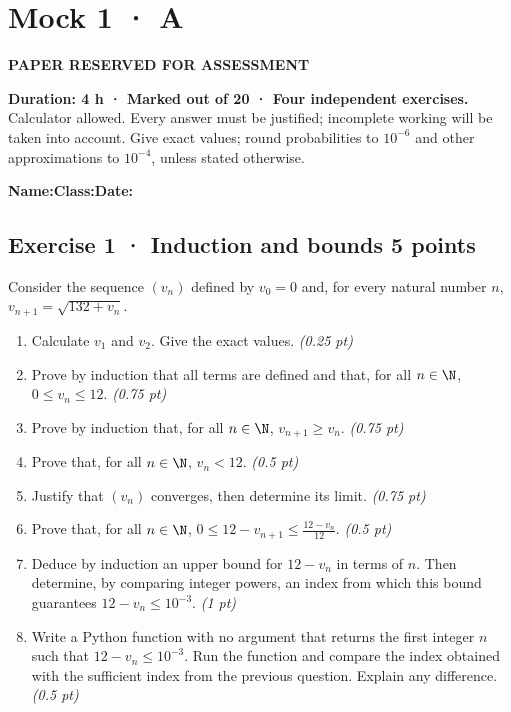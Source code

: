 \fi

\ifprof

\clearpage{}\label{sujet:5-3}

\section*{Mock 1 · A}

{\sffamily\bfseries\color{amber}PAPER RESERVED FOR ASSESSMENT\par}

\textbf{Duration: 4 h · Marked out of 20 · Four independent exercises.}\\Calculator allowed. Every answer must be justified; incomplete working will be taken into account. Give exact values; round probabilities to $10^{-6}$ and other approximations to $10^{-4}$, unless stated otherwise.

\smallskip\textbf{Name:}\enspace\dotfill\quad\textbf{Class:}\enspace\dotfill\quad\textbf{Date:}\enspace\dotfill

\subsection*{Exercise 1 · Induction and bounds \hfill 5 points}Consider the sequence $(v_n)$ defined by $v_0=0$ and, for every natural number $n$, $v_{n+1}=\sqrt{132+v_n}$.

\begin{enumerate}

\item Calculate $v_1$ and $v_2$. Give the exact values. \hfill\textit{(0.25 pt)}

\item Prove by induction that all terms are defined and that, for all $n\in\N$, $0\le v_n\le12$. \hfill\textit{(0.75 pt)}

\item Prove by induction that, for all $n\in\N$, $v_{n+1}\ge v_n$. \hfill\textit{(0.75 pt)}

\item Prove that, for all $n\in\N$, $v_n<12$. \hfill\textit{(0.5 pt)}

\item Justify that $(v_n)$ converges, then determine its limit. \hfill\textit{(0.75 pt)}

\item Prove that, for all $n\in\N$, $0\le 12-v_{n+1}\le\frac{12-v_n}{12}$. \hfill\textit{(0.5 pt)}

\item Deduce by induction an upper bound for $12-v_n$ in terms of $n$. Then determine, by comparing integer powers, an index from which this bound guarantees $12-v_n\le10^{-3}$. \hfill\textit{(1 pt)}

\item Write a Python function with no argument that returns the first integer $n$ such that $12-v_n\le10^{-3}$. Run the function and compare the index obtained with the sufficient index from the previous question. Explain any difference. \hfill\textit{(0.5 pt)}

\end{enumerate}

